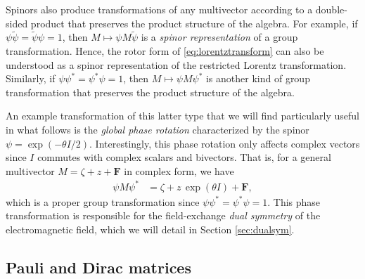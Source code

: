 \documentclass[1p,sort&compress]{elsarticle}
\numberwithin{equation}{section}
\newcommand{\bv}[1]{\mathbf{#1}}
\begin{document}
Spinors also produce transformations of any multivector according to a double-sided product that preserves the product structure of the algebra.  For example, if $\psi\widetilde{\psi} = \widetilde{\psi}\psi = 1$, then $M \mapsto \psi M \widetilde{\psi}$ is a \emph{spinor representation} of a group transformation.  Hence, the rotor form of \eqref{eq:lorentztransform} can also be understood as a spinor representation of the restricted Lorentz transformation.  Similarly, if $\psi \psi^* = \psi^* \psi = 1$, then $M \mapsto \psi M \psi^*$ is another kind of group transformation that preserves the product structure of the algebra.  

An example transformation of this latter type that we will find particularly useful in what follows is the \emph{global phase rotation} characterized by the spinor $\psi = \exp(-\theta I / 2)$.  Interestingly, this phase rotation only affects complex vectors since $I$ commutes with complex scalars and bivectors.  That is, for a general multivector $M = \zeta + z + \bv{F}$ in complex form, we have 
\begin{align}\label{eq:globalphase}
  \psi M \psi^* &= \zeta + z\,\exp(\theta I) + \bv{F},
\end{align}
which is a proper group transformation since $\psi\psi^* = \psi^*\psi = 1$.  This phase transformation is responsible for the field-exchange \emph{dual symmetry} of the electromagnetic field, which we will detail in Section \ref{sec:dualsym}.


\subsection{Pauli and Dirac matrices}\label{sec:paulidirac}

\end{document}

